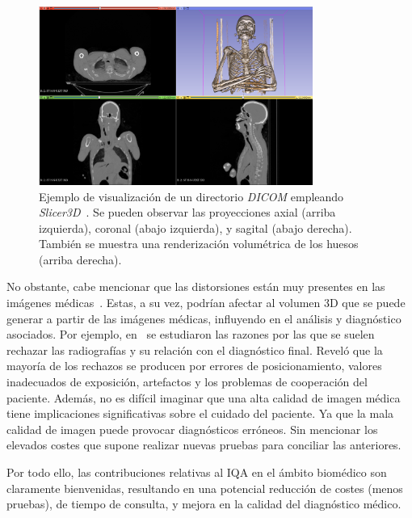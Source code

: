 \begin{figure}[htp]
  \begin{center}
    \includegraphics[width=0.8\textwidth]{imagenes/chapter1/SlicerVisualization}
  \end{center}
  \caption[Ejemplo de visualización de un directorio DICOM.]{Ejemplo de visualización de un directorio \emph{DICOM}
    empleando \emph{Slicer3D}~\cite{Slicer3D}. Se pueden observar
  las proyecciones axial (arriba izquierda), coronal (abajo izquierda),
  y sagital (abajo derecha). También se muestra una renderización volumétrica
de los huesos (arriba derecha).
} 
  \label{fig:SlicerVisualization}
\end{figure}

No obstante, cabe mencionar que las distorsiones
están muy presentes en las imágenes médicas~\cite{MedicalImpactOfDistortions}.
Estas, a su vez, podrían afectar al volumen 3D que se puede generar a partir de
las imágenes médicas, influyendo en el análisis y diagnóstico asociados. Por ejemplo, 
 en~\cite{XrayRejectionFactor} se estudiaron las razones por las que se suelen 
rechazar las radiografías y su relación con el diagnóstico final. 
Reveló que la mayoría de los rechazos se producen por 
errores de posicionamiento, valores inadecuados de exposición, artefactos 
y los problemas de cooperación del paciente. 
Además, no es difícil imaginar que una alta 
calidad de imagen médica tiene implicaciones significativas sobre el cuidado
del paciente. Ya que la mala calidad de imagen puede provocar diagnósticos erróneos. 
Sin mencionar los elevados costes que supone realizar 
nuevas pruebas para conciliar las anteriores. 

Por todo ello, las contribuciones relativas al IQA en el 
ámbito biomédico son claramente bienvenidas, resultando en 
una potencial reducción de costes (menos pruebas), de tiempo de consulta, y mejora 
en la calidad del diagnóstico médico. 


